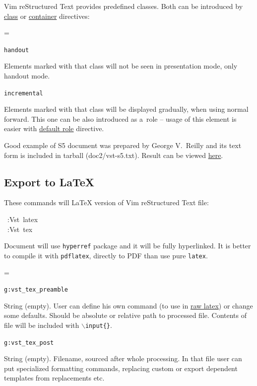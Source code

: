 \documentclass[12pt]{article}
\newenvironment{deflist}[1]{%
\begin{list}{}
{\renewcommand{\makelabel}[1]{\textbf{##1}\hfill}
\settowidth{\labelwidth}{\textbf{#1}}
\leftmargin=\labelwidth
\advance \leftmargin\labelsep}}
{\end{list}}
\begin{document}
Vim reStructured Text provides predefined classes. Both can be introduced by \href{\#lclass}{class} or
\href{\#lcontainer}{container} directives:

\begin{deflist}{iii}

\item[\texttt{handout} ]

Elements marked with that class will not be seen in presentation mode,
only handout mode.

\item[\texttt{incremental}]

Elements marked with that class will be displayed gradually, when using
normal forward. This one can be also introduced as a~role -- usage of this
element is easier with \href{\#ldefault-role}{default role} directive.
\end{deflist}

Good example of S5 document was prepared by George V.~Reilly and its text
form is included in tarball (doc2/vst-s5.txt). Result can be viewed \href{http://skawina.eu.org/mikolaj/vst-s5.html}{here}.

\hypertarget{lexport-to-latex}{}
\subsection{Export to \LaTeX{}}

These commands will \LaTeX{} version of Vim reStructured Text file:

\begin{ttfamily}\begin{flushleft}
\mbox{~:Vst~latex}\\
\mbox{~:Vst~tex}\\
\end{flushleft}\end{ttfamily}

Document will use \texttt{hyperref} package and it will be fully hyperlinked.
It is better to compile it with \texttt{pdflatex}, directly to PDF than use
pure \texttt{latex}.

\hypertarget{lvtp}{}

\begin{deflist}{iii}

\item[\texttt{g:vst\_tex\_preamble}]

String (empty). User can define his own command (to use in
\href{\#lraw-latex}{raw latex}) or change some defaults. Should be absolute or relative
path to processed file. Contents of file will be included with
\texttt{$\backslash$input\{\}}.

\item[\texttt{g:vst\_tex\_post}]

String (empty). Filename, sourced after whole processing. In that file
user can put specialized formatting commands, replacing custom or export
dependent templates from replacements etc.
\end{deflist}
\end{document}

